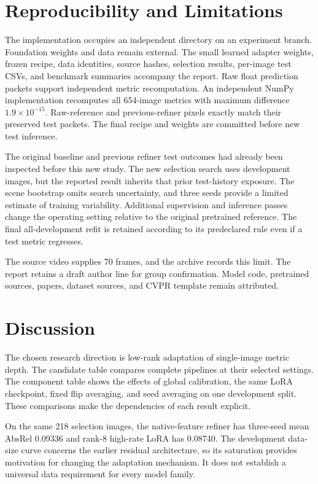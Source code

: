 \documentclass[10pt,twocolumn,letterpaper]{article}
\begin{document}
\section{Reproducibility and Limitations}
The implementation occupies an independent directory on an experiment branch. Foundation weights and data remain external. The small learned adapter weights, frozen recipe, data identities, source hashes, selection results, per-image test CSVs, and benchmark summaries accompany the report. Raw float prediction packets support independent metric recomputation. An independent NumPy implementation recomputes all 654-image metrics with maximum difference $1.9\times10^{-15}$. Raw-reference and previous-refiner pixels exactly match their preserved test packets. The final recipe and weights are committed before new test inference.

The original baseline and previous refiner test outcomes had already been inspected before this new study. The new selection search uses development images, but the reported result inherits that prior test-history exposure. The scene bootstrap omits search uncertainty, and three seeds provide a limited estimate of training variability. Additional supervision and inference passes change the operating setting relative to the original pretrained reference. The final all-development refit is retained according to its predeclared rule even if a test metric regresses.

The source video supplies 70 frames, and the archive records this limit. The report retains a draft author line for group confirmation. Model code, pretrained sources, papers, dataset sources, and CVPR template remain attributed.

\section{Discussion}
The chosen research direction is low-rank adaptation of single-image metric depth. The candidate table compares complete pipelines at their selected settings. The component table shows the effects of global calibration, the same LoRA checkpoint, fixed flip averaging, and seed averaging on one development split. These comparisons make the dependencies of each result explicit.

On the same 218 selection images, the native-feature refiner has three-seed mean AbsRel 0.09336 and rank-8 high-rate LoRA has 0.08740. The development data-size curve concerns the earlier residual architecture, so its saturation provides motivation for changing the adaptation mechanism. It does not establish a universal data requirement for every model family.
\end{document}
